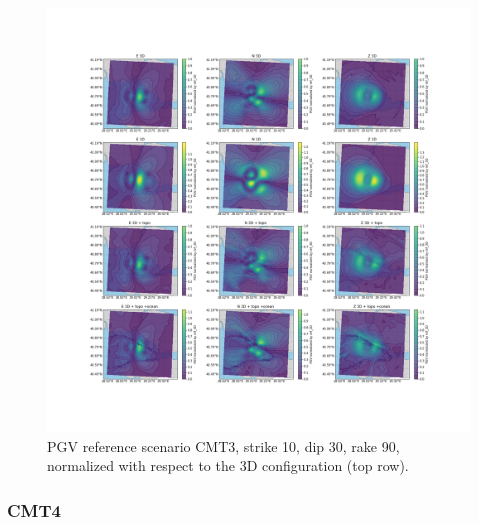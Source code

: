 \documentclass[../Text/00main.tex]{subfiles}
\begin{document}
\begin{figure}[h]
    \centering
    \includegraphics[width=1.2\linewidth]{images_results/Ref_scenarios_normalized_sc3.png}
    \caption{PGV reference scenario CMT3, strike 10, dip 30, rake 90, normalized with respect to the 3D configuration (top row).}
    \label{fig:ref_CMT3}
\end{figure}

\subsubsection{CMT4}
\end{document}
